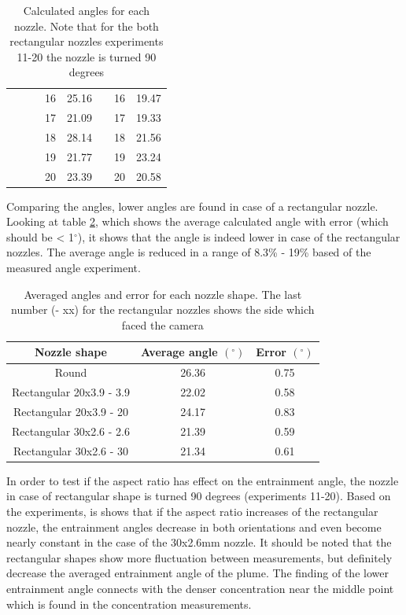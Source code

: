 \begin{table}[ht!]
\begin{adjustbox}{max width = 0.6\linewidth}
\begin{tabular}{lll|c|c|c|c|c|}
 &  &  & 16 & 25.16 &  & 16 & 19.47 \\ \cline{4-5} \cline{7-8} 
 &  &  & 17 & 21.09 &  & 17 & 19.33 \\ \cline{4-5} \cline{7-8} 
 &  &  & 18 & 28.14 &  & 18 & 21.56 \\ \cline{4-5} \cline{7-8} 
 &  &  & 19 & 21.77 &  & 19 & 23.24 \\ \cline{4-5} \cline{7-8} 
 &  &  & 20 & 23.39 &  & 20 & 20.58 \\ \cline{4-5} \cline{7-8} 
\end{tabular}
\end{adjustbox}
\caption{Calculated angles for each nozzle. Note that for the both rectangular nozzles experiments 11-20 the nozzle is turned 90 degrees}
\label{tab:angles}
\end{table}

\noindent Comparing the angles, lower angles are found in case of a rectangular nozzle. Looking at table \ref{tab:average_angles}, which shows the average calculated angle with error (which should be < 1$^\circ$), it shows that the angle is indeed lower in case of the rectangular nozzles. The average angle is reduced in a range of 8.3\% - 19\% based of the measured angle experiment.

\begin{table}[ht!]
\centering
\begin{adjustbox}{max width = 0.8\textwidth}
\begin{tabular}{|c|c|c|}
\hline
\textbf{Nozzle shape} & \textbf{Average angle $(^\circ)$} & \textbf{Error $(^\circ)$} \\ \hline
Round & 26.36 & 0.75 \\ \hline
Rectangular 20x3.9 - 3.9 & 22.02 & 0.58 \\ \hline
Rectangular 20x3.9 - 20 & 24.17 & 0.83 \\ \hline
Rectangular 30x2.6 - 2.6 & 21.39 & 0.59 \\ \hline
Rectangular 30x2.6 - 30 & 21.34 & 0.61 \\ \hline
\end{tabular}
\end{adjustbox}
\caption{Averaged angles and error for each nozzle shape. The last number (- xx) for the rectangular nozzles shows the side which faced the camera}
\label{tab:average_angles}
\end{table}

\noindent In order to test if the aspect ratio has effect on the entrainment angle, the nozzle in case of rectangular shape is turned 90 degrees (experiments 11-20). Based on the experiments, is shows that if the aspect ratio increases of the rectangular nozzle, the entrainment angles decrease in both orientations and even become nearly constant in the case of the 30x2.6mm nozzle. It should be noted that the rectangular shapes show more fluctuation between measurements, but definitely decrease the averaged entrainment angle of the plume. The finding of the lower entrainment angle connects with the denser concentration near the middle point which is found in the concentration measurements.


